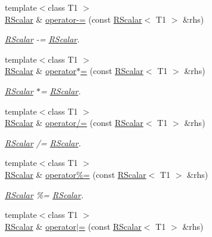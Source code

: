 \begin{DoxyCompactItemize}
{\footnotesize template$<$class T1 $>$ }\\\mbox{\hyperlink{classENSEM_1_1RScalar}{R\+Scalar}} \& \mbox{\hyperlink{classENSEM_1_1RScalar_a6d158db5ecf3dcc81fe905c6664cac58}{operator-\/=}} (const \mbox{\hyperlink{classENSEM_1_1RScalar}{R\+Scalar}}$<$ T1 $>$ \&rhs)
\begin{DoxyCompactList}\small\item\em \mbox{\hyperlink{classENSEM_1_1RScalar}{R\+Scalar}} -\/= \mbox{\hyperlink{classENSEM_1_1RScalar}{R\+Scalar}}. \end{DoxyCompactList}\item 
{\footnotesize template$<$class T1 $>$ }\\\mbox{\hyperlink{classENSEM_1_1RScalar}{R\+Scalar}} \& \mbox{\hyperlink{classENSEM_1_1RScalar_a4e8f4b8988a47a5e5eef56424d0e23d9}{operator$\ast$=}} (const \mbox{\hyperlink{classENSEM_1_1RScalar}{R\+Scalar}}$<$ T1 $>$ \&rhs)
\begin{DoxyCompactList}\small\item\em \mbox{\hyperlink{classENSEM_1_1RScalar}{R\+Scalar}} $\ast$= \mbox{\hyperlink{classENSEM_1_1RScalar}{R\+Scalar}}. \end{DoxyCompactList}\item 
{\footnotesize template$<$class T1 $>$ }\\\mbox{\hyperlink{classENSEM_1_1RScalar}{R\+Scalar}} \& \mbox{\hyperlink{classENSEM_1_1RScalar_a8d8cc49d7fed142b93c987c653465000}{operator/=}} (const \mbox{\hyperlink{classENSEM_1_1RScalar}{R\+Scalar}}$<$ T1 $>$ \&rhs)
\begin{DoxyCompactList}\small\item\em \mbox{\hyperlink{classENSEM_1_1RScalar}{R\+Scalar}} /= \mbox{\hyperlink{classENSEM_1_1RScalar}{R\+Scalar}}. \end{DoxyCompactList}\item 
{\footnotesize template$<$class T1 $>$ }\\\mbox{\hyperlink{classENSEM_1_1RScalar}{R\+Scalar}} \& \mbox{\hyperlink{classENSEM_1_1RScalar_ac5ab25042d679a621ccb42d13fb3b441}{operator\%=}} (const \mbox{\hyperlink{classENSEM_1_1RScalar}{R\+Scalar}}$<$ T1 $>$ \&rhs)
\begin{DoxyCompactList}\small\item\em \mbox{\hyperlink{classENSEM_1_1RScalar}{R\+Scalar}} \%= \mbox{\hyperlink{classENSEM_1_1RScalar}{R\+Scalar}}. \end{DoxyCompactList}\item 
{\footnotesize template$<$class T1 $>$ }\\\mbox{\hyperlink{classENSEM_1_1RScalar}{R\+Scalar}} \& \mbox{\hyperlink{classENSEM_1_1RScalar_ad5838d1c3d7169f6cc7f9b78fe42ac59}{operator$\vert$=}} (const \mbox{\hyperlink{classENSEM_1_1RScalar}{R\+Scalar}}$<$ T1 $>$ \&rhs)

\end{DoxyCompactItemize}
